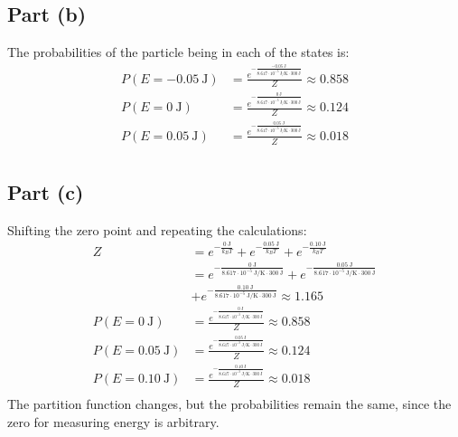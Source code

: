 \documentclass{article}
\begin{document}
\subsection*{Part (b)}
The probabilities of the particle being in each of the states is:
\begin{equation}
    \begin{split}
        P\left(E = -0.05~\unit{\joule}\right) & = \frac{e^{-\frac{-0.05~\unit{\joule}}{8.617 \cdot 10^{-5}~\unit{\joule\per\kelvin} \cdot 300~\unit{\joule}}}}{Z} \approx 0.858 \\
        P\left(E = 0~\unit{\joule}\right) & = \frac{e^{-\frac{0~\unit{\joule}}{8.617 \cdot 10^{-5}~\unit{\joule\per\kelvin} \cdot 300~\unit{\joule}}}}{Z} \approx 0.124 \\
        P\left(E = 0.05~\unit{\joule}\right) & = \frac{e^{-\frac{0.05~\unit{\joule}}{8.617 \cdot 10^{-5}~\unit{\joule\per\kelvin} \cdot 300~\unit{\joule}}}}{Z} \approx 0.018 \\
    \end{split}
\end{equation}
\subsection*{Part (c)}
Shifting the zero point and repeating the calculations:
\begin{equation}
    \begin{split}
        Z & = e^{-\frac{0~\unit{\joule}}{k_BT}} + e^{-\frac{0.05~\unit{\joule}}{k_BT}} + e^{-\frac{0.10~\unit{\joule}}{k_BT}} \\
        & = e^{-\frac{0~\unit{\joule}}{8.617 \cdot 10^{-5}~\unit{\joule\per\kelvin} \cdot 300~\unit{\joule}}} + e^{-\frac{0.05~\unit{\joule}}{8.617 \cdot 10^{-5}~\unit{\joule\per\kelvin} \cdot 300~\unit{\joule}}} \\
        & + e^{-\frac{0.10~\unit{\joule}}{8.617 \cdot 10^{-5}~\unit{\joule\per\kelvin} \cdot 300~\unit{\joule}}} \approx 1.165 \\
        P\left(E = 0~\unit{\joule}\right) & = \frac{e^{-\frac{0~\unit{\joule}}{8.617 \cdot 10^{-5}~\unit{\joule\per\kelvin} \cdot 300~\unit{\joule}}}}{Z} \approx 0.858 \\
        P\left(E = 0.05~\unit{\joule}\right) & = \frac{e^{-\frac{0.05~\unit{\joule}}{8.617 \cdot 10^{-5}~\unit{\joule\per\kelvin} \cdot 300~\unit{\joule}}}}{Z} \approx 0.124 \\
        P\left(E = 0.10~\unit{\joule}\right) & = \frac{e^{-\frac{0.10~\unit{\joule}}{8.617 \cdot 10^{-5}~\unit{\joule\per\kelvin} \cdot 300~\unit{\joule}}}}{Z} \approx 0.018 \\
    \end{split}
\end{equation}
The partition function changes, but the probabilities remain the same, since the zero for measuring energy is arbitrary.
\end{document}
